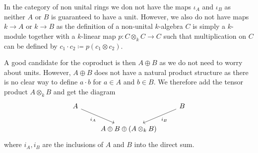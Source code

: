 \documentclass[a4paper]{article}
\begin{document}
\begin{exercise}{3}
In the category of non unital rings we don not have the maps $ \iota_A $ and $ \iota_B $ as neither $ A $ or $ B $ is guaranteed to have a unit. However, we also do not have maps $ k \to A $ or $ k \to B $ as the definition of a non-unital $ k $-algebra $ C $ is simply a $ k $-module together with a $ k $-linear map $ p: C \otimes_k C \to C $ such that multiplication on $ C $ can be defined by $ c_1 \cdot c_2 \coloneqq p(c_1 \otimes c_2) $.

A good candidate for the coproduct is then $ A \oplus B $ as we do not need to worry about units. However, $ A \oplus B $ does not have a natural product structure as there is no clear way to define $ a \cdot b $ for $ a \in A $ and $ b \in B $. We therefore add the tensor product $ A \otimes_{k} B $ and get the diagram
\[\begin{tikzcd}
	A && B \\
	& {A \oplus B \oplus (A\otimes_k B)}
	\arrow["{i_B}", from=1-3, to=2-2]
	\arrow["{i_A}"', from=1-1, to=2-2]
\end{tikzcd}\]
where $ i_A, i_B  $ are the inclusions of $ A $ and $ B $ into the direct sum.


\end{exercise}
\end{document}

